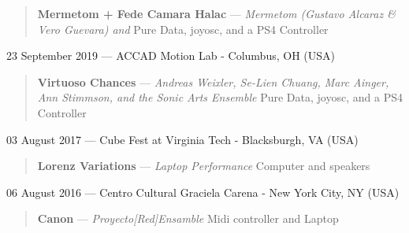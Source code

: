 \documentclass[12pt,overlapped]{res}%
\begin{document}
\begin{resume}
\begin{quote}
\par
\textbf{Mermetom + Fede Camara Halac} --- \textit{Mermetom (Gustavo Alcaraz \& Vero Guevara) and }
Pure Data, joyosc, and a PS4 Controller
\end{quote}%
%
%
%
23 September 2019 --- ACCAD Motion Lab - Columbus, OH (USA)%
\begin{quote}
\par
\textbf{Virtuoso Chances}  ---  \textit{Andreas Weixler, Se{-}Lien Chuang, Marc Ainger, Ann Stimmson, and the Sonic Arts Ensemble}
Pure Data, joyosc, and a PS4 Controller
\end{quote}%
%
%
%
03 August 2017 --- Cube Fest at Virginia Tech - Blacksburgh, VA (USA)%
\begin{quote}
\par
\textbf{Lorenz Variations} --- \textit{Laptop Performance}
Computer and speakers
\end{quote}%

06 August 2016 --- Centro Cultural Graciela Carena - New York City, NY (USA)%
\begin{quote}
\par
\textbf{Canon}  --- \textit{Proyecto{[}Red{]}Ensamble}
Midi controller and Laptop
\end{quote}%
%
%
%

\end{resume}
\end{document}
